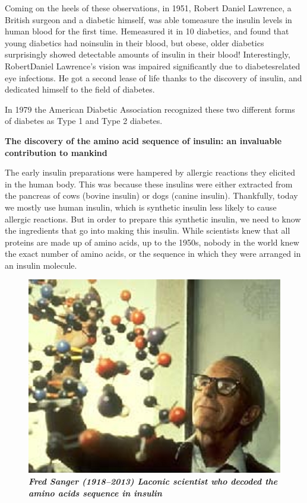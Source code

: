 Coming on the heels of these observations, in 1951, Robert Daniel Lawrence, a British surgeon and a diabetic himself, was able to\break measure the insulin levels in human blood for the first time. He\break measured it in 10 diabetics, and found that young diabetics had no\break insulin in their blood, but obese, older diabetics surprisingly showed detectable amounts of insulin in their blood! Interestingly, Robert\break Daniel Lawrence’s vision was impaired significantly due to diabetes\break related eye infections. He got a second lease of life thanks to the disco\-very of insulin, and dedicated himself to the field of diabetes.

In 1979 the American Diabetic Association recognized these two different forms of diabetes as Type 1 and Type 2 diabetes.

\textbf{The discovery of the amino acid sequence of insulin: an invaluable contribution to mankind}

The early insulin preparations were hampered by allergic reactions they elicited in the human body. This was because these insulins were either extracted from the pancreas of cows (bovine insulin) or dogs (canine insulin). Thankfully, today we mostly use human insulin, which is synthetic insulin less likely to cause allergic reactions. But in order to prepare this synthetic insulin, we need to know the ingredients that go into making this insulin. While scientists knew that all proteins are made up of amino acids, up to the 1950s, nobody in the world knew the exact number of amino acids, or the sequence in which they were arranged in an insulin molecule.

\begin{figure}
\centering
\includegraphics[scale=.9]{images/016.jpg}\\
\textbf{\textit{Fred Sanger (1918–2013) Laconic scientist who decoded the amino acids sequence in insulin}}
\end{figure}

